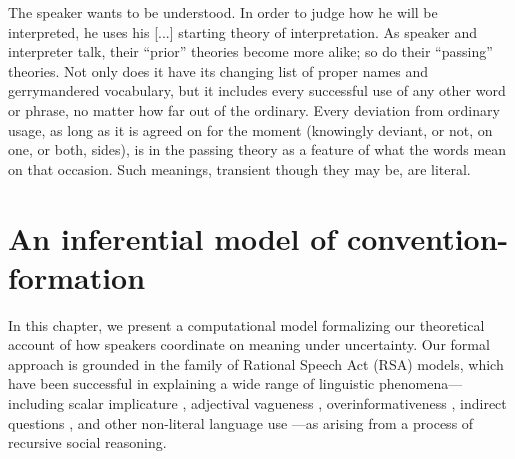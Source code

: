 \begin{savequote}[125mm]
    The speaker wants to be understood. %
    In order to judge how he will be interpreted, he uses his [...] starting theory of interpretation. %
As speaker and interpreter talk, their ``prior'' theories become more alike; so do their ``passing'' theories. %
Not only does it have its changing list of proper names and gerrymandered vocabulary, but it includes every successful use of any other word or phrase, no matter how far out of the ordinary. 
Every deviation from ordinary usage, as long as it is agreed on for the moment (knowingly deviant, or not, on one, or both, sides), is in the passing theory as a feature of what the words mean on that occasion. 
Such meanings, transient though they may be, are literal.
\end{savequote}

\chapter{An inferential model of convention-formation}
\graphicspath{{./figures/modeling/}}

In this chapter, we present a computational model formalizing our theoretical account of how speakers coordinate on meaning under uncertainty. 
Our formal approach is grounded in the family of Rational Speech Act (RSA) models, which have been successful in explaining a wide range of linguistic phenomena---including scalar implicature \cite{GoodmanStuhlmuller13_KnowledgeImplicature}, adjectival vagueness \cite{LassiterGoodman15_AdjectivalVagueness}, overinformativeness \cite{degen2019redundancy}, indirect questions \cite{hawkins_why_2015}, and other non-literal language use \cite{KaoWuBergenGoodman14_NonliteralNumberWords}---as arising from a process of recursive social reasoning.%

